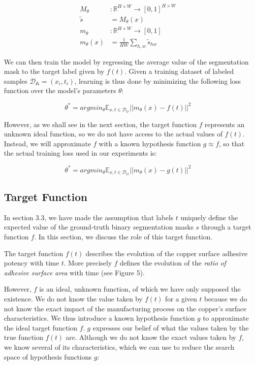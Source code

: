 \documentclass[10pt,twocolumn,letterpaper]{article}
\begin{document}
\begin{subequations}
\begin{align}
M_{\theta}&: \mathbb{R}^{H \times W} \rightarrow [0,1]^{H \times W} \\
\tilde{s}&= M_{\theta}(x) \\
m_{\theta}&:  \mathbb{R}^{H \times W} \rightarrow [0,1]\\
m_{\theta}(x)&=  \frac{1}{HW} \sum_{h,w} \tilde{s}_{hw}
\end{align}
\end{subequations}

We can then train the model by regressing the average value of the segmentation mask to the
target label given by $f(t)$. 
Given a training dataset of labeled samples $\mathcal{D_{tr}}={(x_i, t_i)}$,
learning is thus done by minimizing the following loss function over the model's parameters $\theta$:

\begin{equation}
\theta^* = argmin_{\theta} \mathbb{E}_{x,t \in \mathcal{D}_{tr}} ||m_{\theta}(x) - f(t) ||^2 
\end{equation}

However, as we shall see in the next section, 
the target function $f$ represents an unknown ideal function,
so we do not have access to the actual values of $f(t)$.
Instead, we will approximate $f$ with a known hypothesis function $g \approx f$,
so that the actual training loss used in our experiments is:

\begin{equation}
\theta^* = argmin_{\theta} \mathbb{E}_{x,t \in \mathcal{D}_{tr}} ||m_{\theta}(x) - g(t) ||^2 
\end{equation}

\subsection{Target Function}

In section 3.3, we have made the assumption 
that labels $t$ uniquely define the expected value 
of the ground-truth binary segmentation masks $s$ through a target function $f$.
In this section, we discuss the role of this target function.

The target function $f(t)$ describes the evolution of the copper surface adhesive potency with time $t$.
More precisely $f$ defines the evolution of the \textit{ratio of adhesive surface area} with time (see Figure 5).

However, $f$ is an ideal, unknown function, of which we have only supposed the existence.
We do not know the value taken by $f(t)$ for a given $t$ because we 
do not know the exact impact of the manufacturing process on the copper's surface characteristics.
We thus introduce a known hypothesis function $g$ to approximate the ideal target function $f$.
$g$ expresses our belief of what the values taken by the true function $f(t)$ are.
Although we do not know the exact values taken by $f$, we know several of its characteristics,
which we can use to reduce the search space of hypothesis functions $g$:
\end{document}
